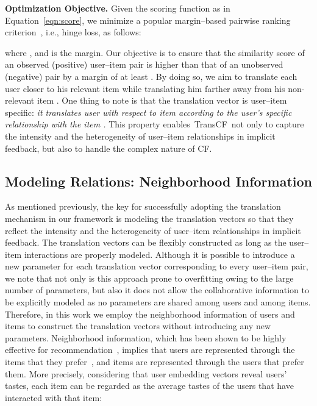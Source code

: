 \documentclass[conference]{IEEEtran}
\newcommand{\propose}{\textsf{{TransCF}}}
\begin{document}
\medskip
\noindent\textbf{Optimization Objective. }
Given the scoring function  as in Equation~\ref{eqn:score}, we minimize a popular margin--based pairwise ranking criterion~\cite{hsieh2017collaborative,bordes2013translating,lin2015learning}, i.e., hinge loss, as follows:

where , and  is the margin. Our objective is to ensure that the similarity score of an observed (positive) user--item pair  is higher than that of an unobserved (negative) pair  by a margin of at least .
By doing so, we aim to translate each user  closer to his relevant item  while translating him farther away from his non-relevant item .
One thing to note is that the translation vector  is user--item specific: \textit{it translates user  with respect to item  according to the user's specific relationship with the item .}
This property enables~\propose~not only to capture the intensity and the heterogeneity of user--item relationships in implicit feedback, but also to handle the complex nature of CF.
\subsection{Modeling Relations: Neighborhood Information}
\label{met:Neighbor}
As mentioned previously, the key for successfully adopting the translation mechanism in our framework is modeling the translation vectors so that they reflect the
intensity and the heterogeneity of user--item relationships in implicit feedback.
The translation vectors can be flexibly constructed as long as the user--item interactions are properly modeled.
Although it is possible to introduce a new parameter for each translation vector corresponding to every user--item pair, we note that not only is this approach prone to overfitting owing to the large number of parameters, but also it does not allow the collaborative information to be explicitly modeled as no parameters are shared among users and among items.
Therefore, in this work we employ the neighborhood information of users and items to construct the translation vectors without introducing any new parameters.
Neighborhood information, which has been shown to be highly effective for recommendation~\cite{wu2016collaborative,ning2011slim,desrosiers2011comprehensive,sarwar2001item}, implies that users are represented through the items that they prefer~\cite{koren2008factorization,kabbur2013fism}, and items are represented through the users that prefer them.
More precisely, considering that user embedding vectors reveal users' tastes, each item can be regarded as the average tastes of the users that have interacted with that item:
\end{document}
